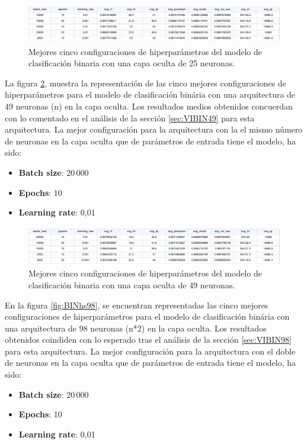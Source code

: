 \begin{figure}[H]
    \centering
    \includegraphics[width=1\textwidth]{./img/modelo/BINhs25.pdf}
    \caption{Mejores cinco configuraciones de hiperparámetros del modelo de clasificación binaria con una capa oculta de 25 neuronas.}
    \label{fig:BINhs25}
\end{figure}



La figura \ref{fig:BINhs49}, muestra la representación de las cinco mejores configuraciones de hiperparámetros para el modelo de clasificación binária con una arquitectura de 49 neuronas (n) en la capa oculta. Los resultados medios obtenidos concuerdan con lo comentado en el análisis de la sección \ref{sec:VIBIN49} para esta arquitectura. La mejor configuración para la arquitectura con la el mismo número de neuronas en la capa oculta que de parámetros de entrada tiene el modelo, ha sido:
\begin{itemize}
	\item \textbf{Batch size}: 20\,000
	\item \textbf{Epochs}: 10
	\item \textbf{Learning rate}: 0,01
\end{itemize}

\begin{figure}[H]
    \centering
    \includegraphics[width=1\textwidth]{./img/modelo/BINhs49.pdf}
    \caption{Mejores cinco configuraciones de hiperparámetros del modelo de clasificación binaria con una capa oculta de 49 neuronas.}
    \label{fig:BINhs49}
\end{figure}


En la figura \ref{fig:BINhs98}, se encuentran representadas las cinco mejores configuraciones de hiperparámetros para el modelo de clasificación binária con una arquitectura de 98 neuronas (n*2) en la capa oculta. Los resultados obtenidos coindiden con lo esperado tras el análisis de la sección \ref{sec:VIBIN98} para esta arquitectura. La mejor configuración para la arquitectura con el doble de neuronas en la capa oculta que de parámetros de entrada tiene el modelo, ha sido:
\begin{itemize}
	\item \textbf{Batch size}: 20\,000
	\item \textbf{Epochs}: 10
	\item \textbf{Learning rate}: 0,01
\end{itemize}

